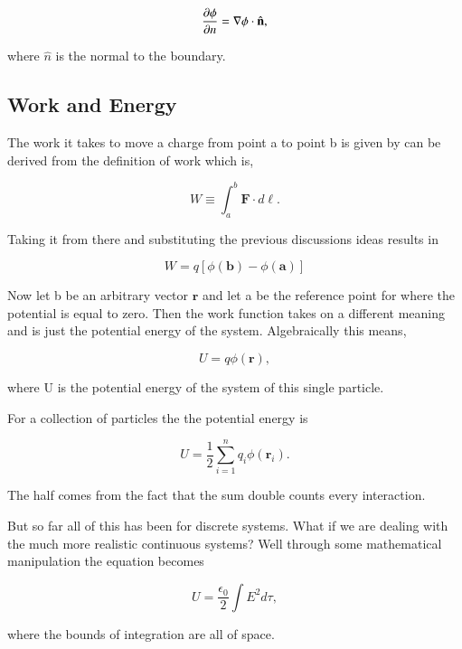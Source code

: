 \documentclass[preprint, review,12pt]{elsarticle}
\def\.{\cdot}
\def\b{\textbf}
\def\bell{\bm{\ell}}
\def\={\equiv}
\newcommand{\pd}[2]{\frac{\partial #1 }{\partial #2}}
\newcommand{\hb}[1]{\hat{\b #1}}
\begin{document}
\begin{equation}
    \pd{\phi}{n} = \nabla \phi \. \hb{n},
\end{equation}

where $\hat{n}$ is the normal to the boundary. 


\subsection{Work and Energy}

The work it takes to move a charge from point a to point b is given by can be derived from the definition of work which is,

\begin{equation}
    W \= \int_a^b \b{F}\. d\bell.
\end{equation}

Taking it from there and substituting the previous discussions ideas results in

\begin{equation}
    W = q[\phi(\b{b})-\phi(\b{a})]
\end{equation}

Now let b be an arbitrary vector $\b{r}$ and let a be the reference point for where the potential is equal to zero. Then the work function takes on a different meaning and is just the potential energy of the system. Algebraically this means,

\begin{equation}
    U = q\phi(\b{r}),
\end{equation}

where U is the potential energy of the system of this single particle.

For a collection of particles the the potential energy is

\begin{equation}
    U = \frac{1}{2}\sum_{i=1}^n q_i \phi(\b{r}_i).
\end{equation}

The half comes from the fact that the sum double counts every interaction.

But so far all of this has been for discrete systems. What if we are dealing with the much more realistic continuous systems? Well through some mathematical manipulation the equation becomes 

\begin{equation}
    U = \frac{\epsilon_0}{2}\int E^2 d\tau, 
\end{equation}

where the bounds of integration are all of space.
\end{document}
